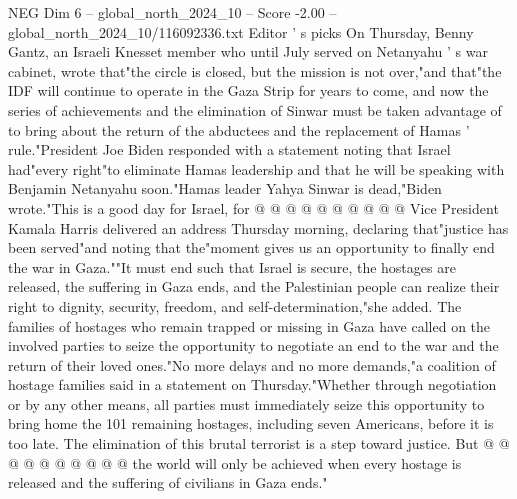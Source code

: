 \begin{textsample}{NEG Dim 6 – global\_north\_2024\_10 – Score -2.00 – global\_north\_2024\_10/116092336.txt}
Editor ' s picks On Thursday, Benny Gantz, an Israeli Knesset member who until July served on Netanyahu ' s war cabinet, wrote that"the circle is closed, but the mission is not over,"and that"the IDF will continue to operate in the Gaza Strip for years to come, and now the series of achievements and the elimination of Sinwar must be taken advantage of to bring about the return of the abductees and the replacement of Hamas ' rule."President Joe Biden responded with a statement noting that Israel had"every right"to eliminate Hamas leadership and that he will be speaking with Benjamin Netanyahu soon."Hamas leader Yahya Sinwar is dead,"Biden wrote."This is a good day for Israel, for @ @ @ @ @ @ @ @ @ @ Vice President Kamala Harris delivered an address Thursday morning, declaring that"justice has been served"and noting that the"moment gives us an opportunity to finally end the war in Gaza.""It must end such that Israel is secure, the hostages are released, the suffering in Gaza ends, and the Palestinian people can realize their right to dignity, security, freedom, and self-determination,"she added.
The families of hostages who remain trapped or missing in Gaza have called on the involved parties to seize the opportunity to negotiate an end to the war and the return of their loved ones."No more delays and no more demands,"a coalition of hostage families said in a statement on Thursday."Whether through negotiation or by any other means, all parties must immediately seize this opportunity to bring home the 101 remaining hostages, including seven Americans, before it is too late.
The elimination of this brutal terrorist is a step toward justice.
But @ @ @ @ @ @ @ @ @ @ the world will only be achieved when every hostage is released and the suffering of civilians in Gaza ends."

\end{textsample}
